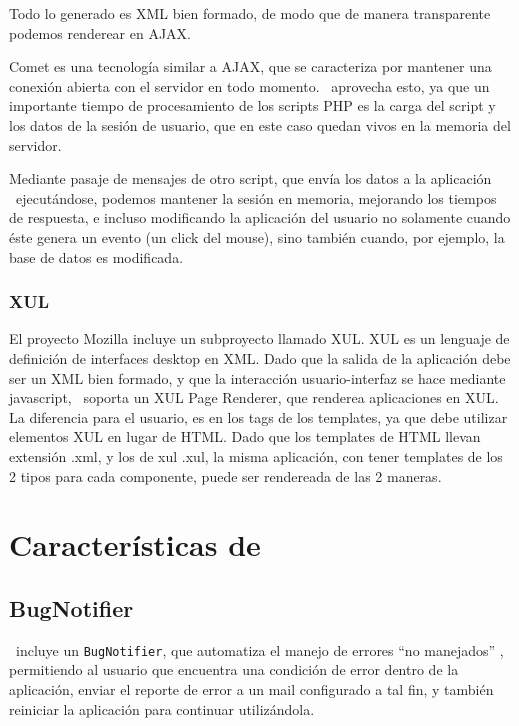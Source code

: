 Todo lo generado es XML bien formado, de modo que de manera transparente podemos renderear en AJAX.

Comet es una tecnología similar a AJAX, que se caracteriza por mantener una conexión abierta con el servidor en todo momento. \PWB \ aprovecha esto, ya que un importante tiempo de procesamiento de los scripts PHP es la carga del script y los datos de la sesión de usuario, que en este caso quedan vivos en la memoria del servidor.

Mediante pasaje de mensajes de otro script, que envía los datos a la aplicación \PWB \ ejecutándose, podemos mantener la sesión en memoria, mejorando los tiempos de respuesta, e incluso modificando la aplicación del usuario no solamente cuando éste genera un evento (un click del mouse), sino también cuando, por ejemplo, la base de datos es modificada.

\subsubsection{XUL}

El proyecto Mozilla incluye un subproyecto llamado XUL. XUL es un lenguaje de definición de interfaces desktop en XML. Dado que la salida de la aplicación debe ser un XML bien formado, y que la interacción usuario-interfaz se hace mediante javascript, \PWB \ soporta un XUL Page Renderer, que renderea aplicaciones en XUL. La diferencia para el usuario, es en los tags de los templates, ya que debe utilizar elementos XUL en lugar de HTML. Dado que los templates de HTML llevan extensión .xml, y los de xul .xul, la misma aplicación, con tener templates de los 2 tipos para cada componente, puede ser rendereada de las 2 maneras.

\section{Características de \PITS}

\subsection{BugNotifier}

\PWB \ incluye un \verb"BugNotifier", que automatiza el manejo de errores ``no manejados'' , permitiendo al usuario que encuentra una condición de error dentro de la aplicación, enviar el reporte de error a un mail configurado a tal fin, y también reiniciar la aplicación para continuar utilizándola.

